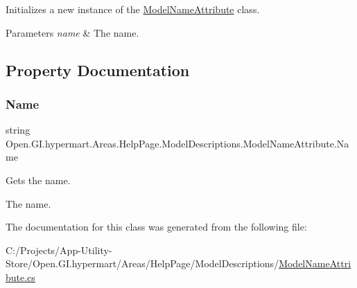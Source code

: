 Initializes a new instance of the \hyperlink{class_open_1_1_g_i_1_1hypermart_1_1_areas_1_1_help_page_1_1_model_descriptions_1_1_model_name_attribute}{Model\+Name\+Attribute} class. 


\begin{DoxyParams}{Parameters}
{\em name} & The name.\\
\hline
\end{DoxyParams}


\subsection{Property Documentation}
\hypertarget{class_open_1_1_g_i_1_1hypermart_1_1_areas_1_1_help_page_1_1_model_descriptions_1_1_model_name_attribute_a1388599f97bb13f4b52da9cebfd994d3}{}\label{class_open_1_1_g_i_1_1hypermart_1_1_areas_1_1_help_page_1_1_model_descriptions_1_1_model_name_attribute_a1388599f97bb13f4b52da9cebfd994d3} 
\subsubsection{\texorpdfstring{Name}{Name}}
{\footnotesize\ttfamily string Open.\+G\+I.\+hypermart.\+Areas.\+Help\+Page.\+Model\+Descriptions.\+Model\+Name\+Attribute.\+Name\hspace{0.3cm}{\ttfamily [get]}}



Gets the name. 

The name. 

The documentation for this class was generated from the following file\+:\begin{DoxyCompactItemize}
\item 
C\+:/\+Projects/\+App-\/\+Utility-\/\+Store/\+Open.\+G\+I.\+hypermart/\+Areas/\+Help\+Page/\+Model\+Descriptions/\hyperlink{_model_name_attribute_8cs}{Model\+Name\+Attribute.\+cs}\end{DoxyCompactItemize}
